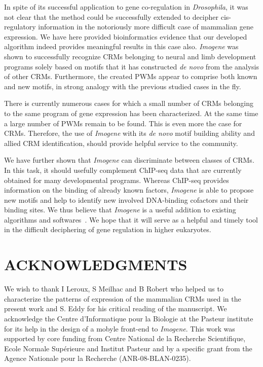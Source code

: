 \documentclass[a4,center,fleqn]{NAR}
\begin{document}
In spite of its successful application to gene co-regulation in {\em
Drosophila}, it was not clear that the method could be
successfully extended to decipher
cis-regulatory information in the notoriously more difficult case of mammalian
gene expression.
We have here provided bioinformatics evidence that our developed algorithm
indeed provides meaningful results in this case also.
{\em Imogene} was shown to successfully recognize  CRMs  belonging  to neural
and limb development programs solely based on motifs that it has constructed
{\em de novo} from the analysis of other CRMs.  Furthermore, the created PWMs
appear to comprise both known and new motifs, in strong analogy with the
previous studied cases in the fly.

There is currently numerous cases for which  a small number of CRMs belonging
to the same program of gene expression has been characterized.
At the same time a large number of PWMs remain to be found.
This is even more the case for CRMs.
Therefore, the use of \textit{Imogene} with its {\em de novo} motif building
ability and allied CRM identification, should provide helpful service  to the
community.

We have further shown that {\em Imogene} can discriminate between classes of
CRMs.
In this task, it should usefully complement ChIP-seq data that are
currently obtained for many developmental programs.
Whereas ChIP-seq provides information on the binding of already known factors,
{\em Imogene} is able to propose new motifs and help to identify new involved
DNA-binding cofactors and their binding sites. 
We thus believe that {\em Imogene} is a useful addition to existing
algorithms and softwares~\cite{Herrmann2012uq}.
We hope that it will  serve as a helpful and timely  tool in the difficult
deciphering  of gene regulation  in higher eukaryotes.


\section{ACKNOWLEDGMENTS}

We wish to thank I Leroux, S Meilhac and B Robert who helped us to characterize
the  patterns of expression of the mammalian CRMs used in the present work and
S. Eddy for his critical reading of the manuscript.
We acknowledge the Centre d'Informatique pour la Biologie at the Pasteur
institute for its help in the design of a mobyle front-end to {\em Imogene}.
This work was supported by core funding from Centre National de la Recherche
Scientifique, Ecole Normale Sup\'erieure and  Institut Pasteur and by
a specific grant from the Agence Nationale pour la Recherche
(ANR-08-BLAN-0235).
\end{document}
